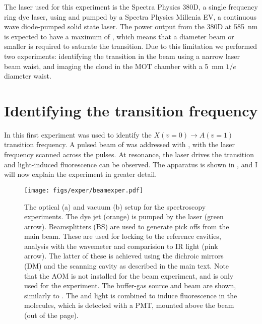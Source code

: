 The  laser used for this experiment is the Spectra Physics 380D, a single
frequency ring dye laser, using  and pumped by a Spectra
Physics Millenia EV, a continuous wave diode-pumped solid state laser. The
power output from the 380D at
\SI{585}{\nano\meter} is expected to have a maximum of , which means
that a  diameter beam or smaller is required to saturate the transition.
Due to this limitation we performed two experiments: identifying the transition
in the \CaF{} beam using a narrow laser beam waist, and imaging the \CaF{}
cloud in the MOT chamber with a \SI{5}{\milli\meter} $1/e$ diameter waist.

\section{Identifying the transition frequency}

In this first experiment  was used to identify the $X(v=0)
\rightarrow A(v=1)$ transition frequency. A pulsed beam of \CaF{} was addressed
with , with the laser frequency scanned across the pulses. At
resonance, the laser drives the transition and light-induced fluorescence can
be observed. The apparatus is shown in , and I will
now explain the experiment in greater detail.

\begin{figure}
  \centering
  \texttt{[image: figs/exper/beamexper.pdf]}
  \caption{The optical (a) and vacuum (b) setup for the spectroscopy
    experiments. The dye jet (orange) is pumped by the  laser (green
    arrow). Beamsplitters (BS) are used to generate pick offs from the main
    beam. These are used for locking
    to the reference cavities, analysis with the wavemeter and comparision to
    IR light (pink arrow). The latter of these is achieved using the dichroic
    mirrors (DM) and  the scanning cavity as described in the main text. Note
    that the AOM is not installed for the beam experiment, and is
    only used for the  experiment. The buffer-gas source and \CaF{}
    beam are shown, similarly to . The
     and  light is combined to induce fluorescence in
    the molecules, which is detected with a PMT, mounted above the beam (out of
    the page).
  }
  \label{exper:fig:beamapp} 
\end{figure}


